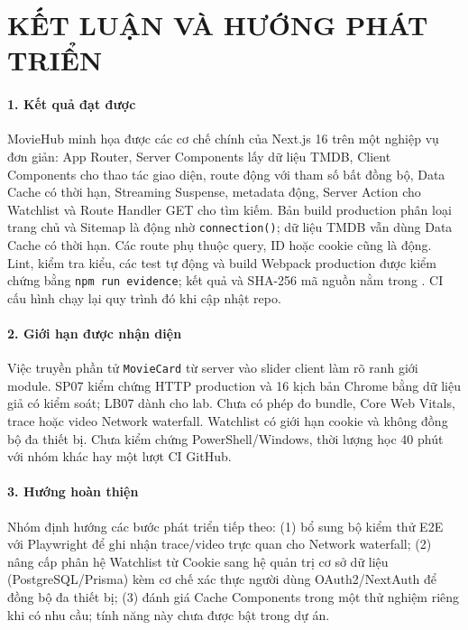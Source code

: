 \documentclass[12pt,a4paper]{extarticle}
\begin{document}
\newpage
\section*{KẾT LUẬN VÀ HƯỚNG PHÁT TRIỂN}
{}

\paragraph*{1. Kết quả đạt được}
MovieHub minh họa được các cơ chế chính của Next.js 16 trên một nghiệp vụ đơn giản: App Router, Server Components lấy dữ liệu TMDB, Client Components cho thao tác giao diện, route động với tham số bất đồng bộ, Data Cache có thời hạn, Streaming Suspense, metadata động, Server Action cho Watchlist và Route Handler GET cho tìm kiếm. Bản build production phân loại trang chủ và Sitemap là động nhờ \texttt{connection()}; dữ liệu TMDB vẫn dùng Data Cache có thời hạn. Các route phụ thuộc query, ID hoặc cookie cũng là động. Lint, kiểm tra kiểu, các test tự động và build Webpack production được kiểm chứng bằng \texttt{npm run evidence}; kết quả và SHA-256 mã nguồn nằm trong . CI cấu hình chạy lại quy trình đó khi cập nhật repo.

\paragraph*{2. Giới hạn được nhận diện}
Việc truyền phần tử \texttt{MovieCard} từ server vào slider client làm rõ ranh giới module. SP07 kiểm chứng HTTP production và 16 kịch bản Chrome bằng dữ liệu giả có kiểm soát; LB07 dành cho lab. Chưa có phép đo bundle, Core Web Vitals, trace hoặc video Network waterfall. Watchlist có giới hạn cookie và không đồng bộ đa thiết bị. Chưa kiểm chứng PowerShell/Windows, thời lượng học 40 phút với nhóm khác hay một lượt CI GitHub.

\paragraph*{3. Hướng hoàn thiện}
Nhóm định hướng các bước phát triển tiếp theo: (1) bổ sung bộ kiểm thử E2E với Playwright để ghi nhận trace/video trực quan cho Network waterfall; (2) nâng cấp phân hệ Watchlist từ Cookie sang hệ quản trị cơ sở dữ liệu (PostgreSQL/Prisma) kèm cơ chế xác thực người dùng OAuth2/NextAuth để đồng bộ đa thiết bị; (3) đánh giá Cache Components trong một thử nghiệm riêng khi có nhu cầu; tính năng này chưa được bật trong dự án.
\end{document}
